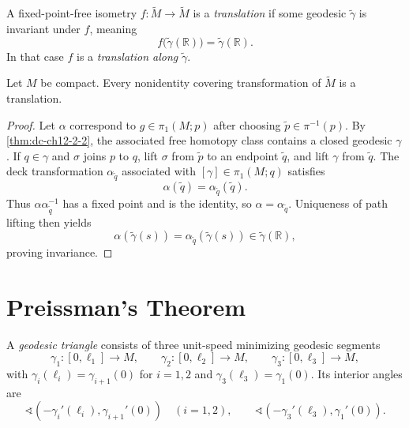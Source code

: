 \begin{definition}
  \label{def:dc-ch12-2-5}
  A fixed-point-free isometry $f:\tilde M\to\tilde M$ is a
  \emph{translation} if some geodesic $\tilde\gamma$ is invariant under $f$,
  meaning
  \[
    f\bigl(\tilde\gamma(\mathbb R)\bigr)=\tilde\gamma(\mathbb R).
  \]
  In that case $f$ is a \emph{translation along} $\tilde\gamma$.
\end{definition}

\begin{proposition}
  \label{prop:dc-ch12-2-6}
  Let $M$ be compact. Every nonidentity covering transformation of
  $\tilde M$ is a translation.
\end{proposition}
\begin{proof}
  \sketch
  Let $\alpha$ correspond to $g\in\pi_1(M;p)$ after choosing
  $\tilde p\in\pi^{-1}(p)$. By \cref{thm:dc-ch12-2-2}, the associated free
  homotopy class contains a closed geodesic $\gamma$. If $q\in\gamma$ and
  $\sigma$ joins $p$ to $q$, lift $\sigma$ from $\tilde p$ to an endpoint
  $\tilde q$, and lift $\gamma$ from $\tilde q$. The deck transformation
  $\alpha_{\tilde q}$ associated with $[\gamma]\in\pi_1(M;q)$ satisfies
  \[
    \alpha(\tilde q)=\alpha_{\tilde q}(\tilde q).
  \]
  Thus $\alpha\alpha_{\tilde q}^{-1}$ has a fixed point and is the identity, so
  $\alpha=\alpha_{\tilde q}$. Uniqueness of path lifting then yields
  \[
    \alpha(\tilde\gamma(s))
    =\alpha_{\tilde q}(\tilde\gamma(s))\in\tilde\gamma(\mathbb R),
  \]
  proving invariance.
\end{proof}

\section{Preissman's Theorem}

A \emph{geodesic triangle} consists of three unit-speed minimizing geodesic
segments
\[
  \gamma_1:[0,\ell_1]\to M,\qquad
  \gamma_2:[0,\ell_2]\to M,\qquad
  \gamma_3:[0,\ell_3]\to M,
\]
with $\gamma_i(\ell_i)=\gamma_{i+1}(0)$ for $i=1,2$ and
$\gamma_3(\ell_3)=\gamma_1(0)$. Its interior angles are
\[
  \sphericalangle(-\gamma_i'(\ell_i),\gamma_{i+1}'(0))\quad(i=1,2),
  \qquad
  \sphericalangle(-\gamma_3'(\ell_3),\gamma_1'(0)).
\]

